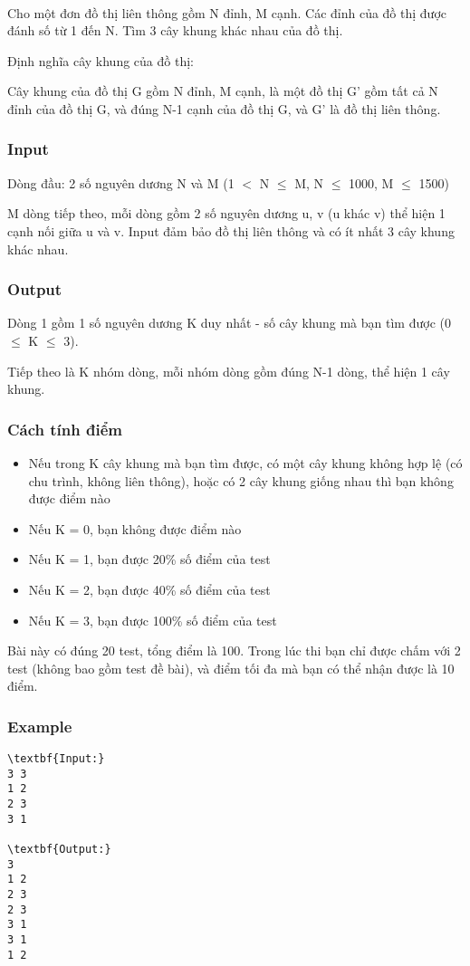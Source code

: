 

 

Cho một đơn đồ thị liên thông gồm N đỉnh, M cạnh. Các đỉnh của đồ thị được đánh số từ 1 đến N. Tìm 3 cây khung khác nhau của đồ thị.


Định nghĩa cây khung của đồ thị:


Cây khung của đồ thị G gồm N đỉnh, M cạnh, là một đồ thị G’ gồm tất cả N đỉnh của đồ thị G, và đúng N-1 cạnh của đồ thị G, và G’ là đồ thị liên thông.

\subsubsection{Input}

Dòng đầu: 2 số nguyên dương N và M (1 $<$ N  $\le$  M, N  $\le$  1000, M  $\le$  1500)


M dòng tiếp theo, mỗi dòng gồm 2 số nguyên dương u, v (u khác v) thể hiện 1 cạnh nối giữa u và v. Input đảm bảo đồ thị liên thông và có ít nhất 3 cây khung khác nhau.

\subsubsection{Output}

Dòng 1 gồm 1 số nguyên dương K duy nhất - số cây khung mà bạn tìm được (0  $\le$  K  $\le$  3).


Tiếp theo là K nhóm dòng, mỗi nhóm dòng gồm đúng N-1 dòng, thể hiện 1 cây khung.

\subsubsection{Cách tính điểm}
\begin{itemize}
	\item Nếu trong K cây khung mà bạn tìm được, có một cây khung không hợp lệ (có chu trình, không liên thông), hoặc có 2 cây khung giống nhau thì bạn không được điểm nào
	\item Nếu K = 0, bạn không được điểm nào
	\item Nếu K = 1, bạn được 20\% số điểm của test
	\item Nếu K = 2, bạn được 40\% số điểm của test
	\item Nếu K = 3, bạn được 100\% số điểm của test
\end{itemize}

Bài này có đúng 20 test, tổng điểm là 100. Trong lúc thi bạn chỉ được chấm với 2 test (không bao gồm test đề bài), và điểm tối đa mà bạn có thể nhận được là 10 điểm.

\subsubsection{Example}
\begin{verbatim}
\textbf{Input:}
3 3
1 2
2 3
3 1

\textbf{Output:}
3
1 2
2 3
2 3
3 1
3 1
1 2\end{verbatim}

